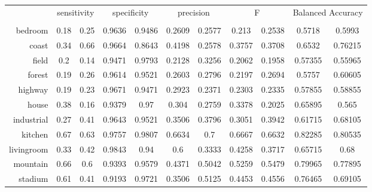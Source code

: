 \documentclass{article}
\newcommand*\rot{\rotatebox{90}}
\begin{document}
\begin{multicols}{2}
\begin{table}
	\begin{tabular}{r|cccccccccc}
	             & \multicolumn{2}{c}{sensitivity} & \multicolumn{2}{c}{specificity} & \multicolumn{2}{c}{precision} & \multicolumn{2}{c}{F}    & \multicolumn{2}{c}{Balanced Accuracy} \\
 & \rot{tinyimages} & \rot{histograms}  & \rot{tinyimages} & \rot{histograms}  & \rot{tinyimages} & \rot{histograms} & \rot{tinyimages} & \rot{histograms} & \rot{tinyimages} & \rot{histograms} \\
	\midrule
	bedroom      & 0.18        & 0.25        & 0.9636      & 0.9486      & 0.2609      & 0.2577     & 0.213       & 0.2538     & 0.5718            & 0.5993     \\
	coast        & 0.34        & 0.66        & 0.9664      & 0.8643      & 0.4198      & 0.2578     & 0.3757      & 0.3708     & 0.6532            & 0.76215    \\
	field        & 0.2         & 0.14        & 0.9471      & 0.9793      & 0.2128      & 0.3256     & 0.2062      & 0.1958     & 0.57355           & 0.55965    \\
	forest       & 0.19        & 0.26        & 0.9614      & 0.9521      & 0.2603      & 0.2796     & 0.2197      & 0.2694     & 0.5757            & 0.60605    \\
	highway      & 0.19        & 0.23        & 0.9671      & 0.9471      & 0.2923      & 0.2371     & 0.2303      & 0.2335     & 0.57855           & 0.58855    \\
	house        & 0.38        & 0.16        & 0.9379      & 0.97        & 0.304       & 0.2759     & 0.3378      & 0.2025     & 0.65895           & 0.565      \\
	industrial   & 0.27        & 0.41        & 0.9643      & 0.9521      & 0.3506      & 0.3796     & 0.3051      & 0.3942     & 0.61715           & 0.68105    \\
	kitchen      & 0.67        & 0.63        & 0.9757      & 0.9807      & 0.6634      & 0.7        & 0.6667      & 0.6632     & 0.82285           & 0.80535    \\
	livingroom   & 0.33        & 0.42        & 0.9843      & 0.94        & 0.6         & 0.3333     & 0.4258      & 0.3717     & 0.65715           & 0.68       \\
	mountain     & 0.66        & 0.6         & 0.9393      & 0.9579      & 0.4371      & 0.5042     & 0.5259      & 0.5479     & 0.79965           & 0.77895    \\
	stadium      & 0.61        & 0.41        & 0.9193      & 0.9721      & 0.3506      & 0.5125     & 0.4453      & 0.4556     & 0.76465           & 0.69105    \\

\end{tabular}
\end{table}
\end{multicols}
\end{document}
